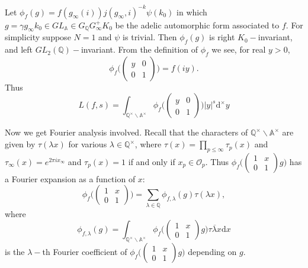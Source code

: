 \documentclass[12pt,a4paper,english]{article}
\theoremstyle{plain}
\theoremstyle{definition}
\begin{document}
Let $\phi_{f}(g)=f(g_{\infty}(i))j(g_{\infty},i)^{-k}\psi(k_{0})$ in which $g=\gamma g_{\infty}k_{0}\in GL_{\mathbb{A}}\in G_{\mathbb{Q}}G^{+}_{\infty}K_{0}$ be the adelic automorphic form associated to $f$. For simplicity suppose $N=1$ and $\psi$ is trivial. Then $\phi_{f}(g)$ is right $K_{0}-$invariant, and left $GL_{2}(\mathbb{Q})-$invariant. From the definition of $\phi_{f}$ we see, for real $y>0$,
\begin{equation*}
    \phi_{f}\bigg(\begin{pmatrix}
    y&0\\
    0&1
    \end{pmatrix}\bigg)=f(iy).
\end{equation*}
Thus
\begin{equation*}
    L(f,s)=\int_{\mathbb{Q^{\times}}\backslash\mathbb{A}^{\times}}\phi_{f}\bigg(\begin{pmatrix}
    y&0\\
    0&1
    \end{pmatrix}\bigg) |y|^{s}\text{d}^{\times}y
\end{equation*}

Now we get Fourier analysis involved. Recall that the characters of $\mathbb{Q}^{\times}\backslash\mathbb{A}^{\times}$ are given by $\tau(\lambda x)$ for various $\lambda\in\mathbb{Q}^{\times}$, where $\tau(x)=\prod_{p\leq \infty}\tau_{p}(x)$ and $\tau_{\infty}(x)=e^{2\pi ix_{\infty}}$ and $\tau_{p}(x)=1$ if and only if $x_{p}\in \mathcal{O}_{p}$. Thus $    \phi_{f}\bigg(\begin{pmatrix}
    1&x\\
    0&1
    \end{pmatrix}g\bigg)$ has a Fourier expansion as a function of $x$:
\begin{equation*}
    \phi_{f}\bigg(\begin{pmatrix}
    1&x\\
    0&1
    \end{pmatrix}\bigg)=\sum_{\lambda\in\mathbb{Q}}\phi_{f,\lambda}(g)\tau(\lambda x),
\end{equation*}
where 
\begin{equation*}
    \phi_{f,\lambda}(g)=\int_{\mathbb{Q}^{\times}\backslash\mathbb{A}^{\times}}\phi_{f}\bigg(\begin{pmatrix}
    1&x\\
    0&1
    \end{pmatrix}g\bigg)\overline{\tau\lambda x}\text{d}x
\end{equation*}
is the $\lambda-$th Fourier coefficient of $\phi_{f}\bigg(\begin{pmatrix}
    1&x\\
    0&1
    \end{pmatrix}g\bigg)$ depending on $g$.
\end{document}
